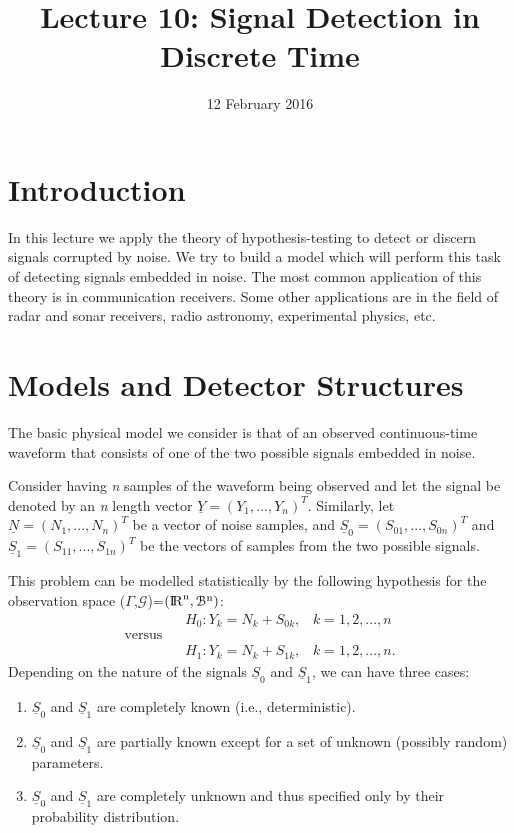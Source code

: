 \documentclass[a4paper,english,12pt]{article}
\title{Lecture 10: Signal Detection in Discrete Time}
\date{12 February 2016}
\begin{document}
\maketitle

\section{Introduction}
In this lecture we apply the theory of hypothesis-testing to detect or discern signals corrupted by noise. We try to build a model which will perform this task of detecting signals embedded in noise. The most common application of this theory is in communication receivers. Some other applications are in the field of radar and sonar receivers, radio astronomy, experimental physics, etc.
\section{Models and Detector Structures}
The basic physical model we consider is that of an observed continuous-time waveform that consists of one of the two possible signals embedded in noise.
\par Consider having \textit{n} samples of the waveform being observed and let the signal be denoted by an \textit{n} length vector $\underline{Y}=(Y_{1},...,Y_{n})^{T}$. Similarly, let $\underline{N}=(N_{1},...,N_{n})^{T}$ be a vector of noise samples, and $\underline{S}_{0}=(S_{01},...,S_{0n})^{T}$ and $\underline{S}_{1}=(S_{11},...,S_{1n})^{T}$ be the vectors of samples from the two possible signals.
\par This problem can be modelled statistically by the following hypothesis for the observation space ($\Gamma$,$\mathcal{G}$)=$({\rm I\!R}^{\text{n}},\mathcal{B}^{\text{n}})$:
\begin{equation}
\begin{split}
\label{hypothesis}
&H_{0}: Y_{k} = N_{k}+S_{0k}, \hspace{10pt}k=1,2,...,n\\
\text{versus}\hspace{10pt}&
\\&H_{1}: Y_{k} = N_{k}+S_{1k}, \hspace{10pt}k=1,2,...,n.	
\end{split}
\end{equation}
Depending on the nature of the signals $\underline{S}_{0}$ and $\underline{S}_{1}$, we can have three cases: 
\begin{enumerate}
\item $\underline{S}_{0}$ and $\underline{S}_{1}$ are completely known (i.e., deterministic).
\item $\underline{S}_{0}$ and $\underline{S}_{1}$ are partially known except for a set of unknown (possibly random) parameters.
\item $\underline{S}_{0}$ and $\underline{S}_{1}$ are completely unknown and thus specified only by their probability distribution.
\end{enumerate}
\end{document}
